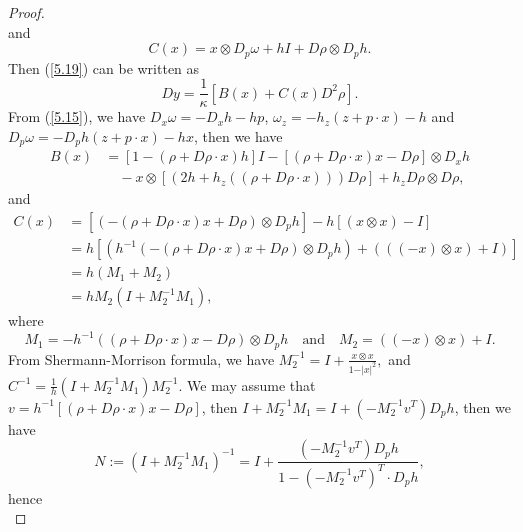 \documentclass[a4paper,12pt,]{article}
\numberwithin{equation}{section}
\numberwithin{equation}{section} \allowdisplaybreaks
\begin{document}
\begin{proof}
\begin{equation}
  \end{equation}
  and
  \begin{equation}\label{5.21}
    C(x) = x \otimes D_{p}\omega + hI + D\rho \otimes D_{p}h.
  \end{equation}
  Then (\ref{5.19}) can be written as
  \begin{equation}\label{5.22}
    Dy = \frac{1}{\kappa}[B(x) + C(x)D^{2}\rho].
  \end{equation}
  From (\ref{5.15}), we have $D_{x}\omega = -D_{x}h -hp$, $\omega_{z} = -h_{z}(z + p \cdot x) - h$ and $D_{p}\omega = -D_{p}h(z + p \cdot x) - hx$, then we have
  \begin{equation}\label{5.23}
    \begin{aligned}
    B(x) & = [1 - (\rho + D\rho \cdot x)h]I - [(\rho + D\rho \cdot x)x - D\rho]\otimes D_{x}h  \\
    & \quad - x\otimes [(2h + h_{z}((\rho + D\rho \cdot x)))D\rho] + h_{z}D\rho \otimes D\rho,
    \end{aligned}
  \end{equation}
  and
  \begin{equation}\label{5.24}
    \begin{aligned}
    C(x) & = [(-(\rho + D\rho \cdot x)x + D\rho) \otimes D_{p}h] - h[(x \otimes x) - I] \\
    & = h[(h^{-1}(-(\rho + D\rho \cdot x)x + D\rho)\otimes D_{p}h) + (((-x) \otimes x) + I)] \\
    & = h(M_{1} + M_{2}) \\
    & = h M_{2}(I + M_{2}^{-1}M_{1}),
    \end{aligned}
  \end{equation}
  where
  \begin{equation*}
    M_{1} = -h^{-1}((\rho + D\rho \cdot x)x - D\rho) \otimes D_{p}h \quad \text{and} \quad M_{2} = ((-x)\otimes x) + I.
  \end{equation*}
  From Shermann-Morrison formula, we have
 $
    M_{2}^{-1} = I + \frac{x \otimes x}{1 - \vert x \vert^{2}},
 $
  and
 $
    C^{-1} = \frac{1}{h}(I + M_{2}^{-1}M_{1})M_{2}^{-1}.
  $
  We may assume that $v = h^{-1}[(\rho + D\rho \cdot x)x - D\rho]$, then $I + M_{2}^{-1}M_{1} = I + (-M_{2}^{-1}v^{T})D_{p}h$, then we have
  \begin{equation*}
    N := (I + M_{2}^{-1}M_{1})^{-1} = I + \frac{(-M_{2}^{-1}v^{T})D_{p}h}{1 - (-M_{2}^{-1}v^{T})^{T}\cdot D_{p}h},
  \end{equation*}
  hence
  \begin{equation}\label{5.25}

\end{equation}
\end{proof}
\end{document}
